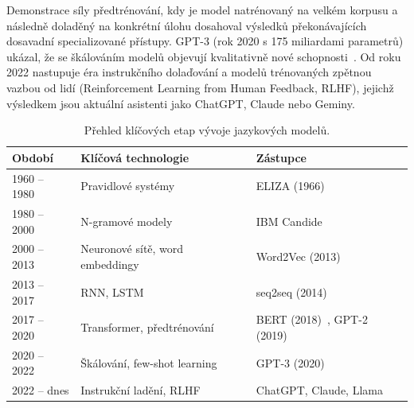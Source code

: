 Demonstrace síly předtrénování, kdy je model natrénovaný na velkém korpusu a následně doladěný na konkrétní úlohu dosahoval výsledků překonávajících dosavadní specializované přístupy.
GPT-3 (rok 2020 s 175 miliardami parametrů) ukázal, že se škálováním modelů objevují kvalitativně nové schopnosti~\cite{brown-gpt3}.
Od roku 2022 nastupuje éra instrukčního dolaďování a modelů trénovaných zpětnou vazbou od lidí (Reinforcement Learning from Human Feedback, RLHF), jejichž výsledkem jsou aktuální asistenti jako ChatGPT, Claude nebo Geminy.


\begin{table}[H]
    \centering
    \begin{tabular}{lll}
        \toprule
        \textbf{Období}   & \textbf{Klíčová technologie}    & \textbf{Zástupce}                             \\
        \midrule
        1960 -- 1980        & Pravidlové systémy              & ELIZA (1966)~\cite{weizenbaum-eliza}          \\
        1980 -- 2000        & N-gramové modely                & IBM Candide                                   \\
        2000 -- 2013        & Neuronové sítě, word embeddingy & Word2Vec (2013)~\cite{mikolov-word2vec}       \\
        2013 -- 2017        & RNN, LSTM                       & seq2seq (2014)                                \\
        2017 -- 2020        & Transformer, předtrénování      & BERT (2018)~\cite{devlin-bert}, GPT-2 (2019)  \\
        2020 -- 2022        & Škálování, few-shot learning    & GPT-3 (2020)~\cite{brown-gpt3}                \\
        2022 -- dnes        & Instrukční ladění, RLHF         & ChatGPT, Claude, Llama                        \\
        \bottomrule
    \end{tabular}
    \caption{Přehled klíčových etap vývoje jazykových modelů.}
    \label{tab:llm-history-summary}
\end{table}

\endinput